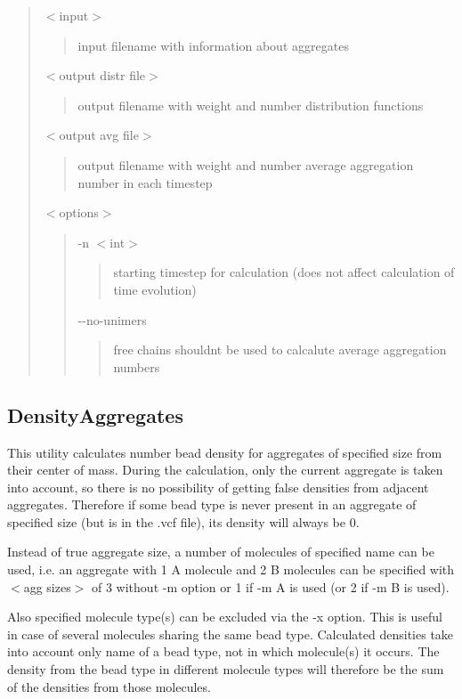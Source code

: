 \begin{quote}
{\ttfamily $<$input$>$} \begin{quote}
input filename with information about aggregates \end{quote}
{\ttfamily $<$output distr file$>$} \begin{quote}
output filename with weight and number distribution functions \end{quote}
{\ttfamily $<$output avg file$>$} \begin{quote}
output filename with weight and number average aggregation number in each timestep \end{quote}
{\ttfamily $<$options$>$} \begin{quote}
{\ttfamily -\/n $<$int$>$} \begin{quote}
starting timestep for calculation (does not affect calculation of time evolution) \end{quote}
{\ttfamily -\/-\/no-\/unimers} \begin{quote}
free chains shouldn\textquotesingle{}t be used to calcalute average aggregation numbers \end{quote}
\end{quote}
\end{quote}
\hypertarget{Common_AggDensity}{}\subsection{Density\+Aggregates}\label{Common_AggDensity}
This utility calculates number bead density for aggregates of specified size from their center of mass. During the calculation, only the current aggregate is taken into account, so there is no possibility of getting \textquotesingle{}false\textquotesingle{} densities from adjacent aggregates. Therefore if some bead type is never present in an aggregate of specified size (but is in the {\ttfamily .vcf} file), its density will always be 0.

Instead of true aggregate size, a number of molecules of specified name can be used, i.\+e. an aggregate with 1 {\ttfamily A} molecule and 2 {\ttfamily B} molecules can be specified with {\ttfamily $<$agg sizes$>$} of 3 without {\ttfamily -\/m} option or 1 if {\ttfamily -\/m A} is used (or 2 if {\ttfamily -\/m B} is used).

Also specified molecule type(s) can be excluded via the {\ttfamily -\/x} option. This is useful in case of several molecules sharing the same bead type. Calculated densities take into account only name of a bead type, not in which molecule(s) it occurs. The density from the bead type in different molecule types will therefore be the sum of the densities from those molecules.

